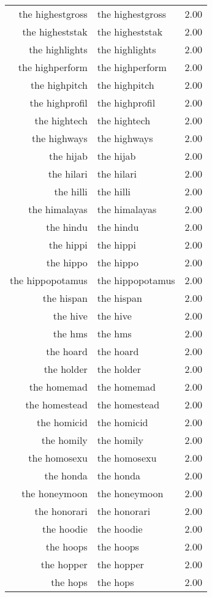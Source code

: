 \begin{table}[ht]
\begin{tabular}{rlr}
  the highestgross & the highestgross & 2.00 \\ 
  the higheststak & the higheststak & 2.00 \\ 
  the highlights & the highlights & 2.00 \\ 
  the highperform & the highperform & 2.00 \\ 
  the highpitch & the highpitch & 2.00 \\ 
  the highprofil & the highprofil & 2.00 \\ 
  the hightech & the hightech & 2.00 \\ 
  the highways & the highways & 2.00 \\ 
  the hijab & the hijab & 2.00 \\ 
  the hilari & the hilari & 2.00 \\ 
  the hilli & the hilli & 2.00 \\ 
  the himalayas & the himalayas & 2.00 \\ 
  the hindu & the hindu & 2.00 \\ 
  the hippi & the hippi & 2.00 \\ 
  the hippo & the hippo & 2.00 \\ 
  the hippopotamus & the hippopotamus & 2.00 \\ 
  the hispan & the hispan & 2.00 \\ 
  the hive & the hive & 2.00 \\ 
  the hms & the hms & 2.00 \\ 
  the hoard & the hoard & 2.00 \\ 
  the holder & the holder & 2.00 \\ 
  the homemad & the homemad & 2.00 \\ 
  the homestead & the homestead & 2.00 \\ 
  the homicid & the homicid & 2.00 \\ 
  the homily & the homily & 2.00 \\ 
  the homosexu & the homosexu & 2.00 \\ 
  the honda & the honda & 2.00 \\ 
  the honeymoon & the honeymoon & 2.00 \\ 
  the honorari & the honorari & 2.00 \\ 
  the hoodie & the hoodie & 2.00 \\ 
  the hoops & the hoops & 2.00 \\ 
  the hopper & the hopper & 2.00 \\ 
  the hops & the hops & 2.00 \\ 

\end{tabular}
\end{table}
